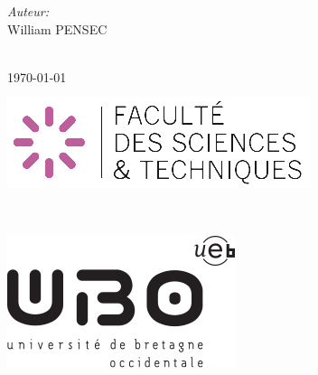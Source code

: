 \documentclass[a4paper,12pt]{report}
\begin{document}
\begin{titlepage}
		\begin{minipage}{0.48\textwidth}
			\begin{center} \large
				\emph{Auteur:}\\
					William \textsc{PENSEC} %
			\end{center}
    \end{minipage}\\[1.5cm]
    
    
    {\today}\\[1.5cm] %
    
    
		\begin{minipage}{0.48\textwidth}
			\begin{flushleft} \large
				\includegraphics[scale=0.8]{ubo_sc.png} %
			\end{flushleft}
    \end{minipage}
		~
    \begin{minipage}{0.48\textwidth}
			\begin{flushright} \large
				\includegraphics[scale=0.5]{ubo.png} %
			\end{flushright}
    \end{minipage}
    
    
    \vfill %
    
    \end{titlepage}
		
\end{document}
